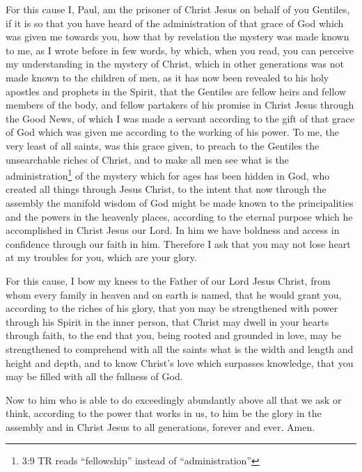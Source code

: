  For this cause I, Paul, am the prisoner of Christ Jesus on
behalf of you Gentiles,  if it is so that you have heard of
the administration of that grace of God which was given me towards you,
 how that by revelation the mystery was made known to me, as
I wrote before in few words,  by which, when you read, you
can perceive my understanding in the mystery of Christ, 
which in other generations was not made known to the children of men, as
it has now been revealed to his holy apostles and prophets in the
Spirit,  that the Gentiles are fellow heirs and fellow
members of the body, and fellow partakers of his promise in Christ Jesus
through the Good News,  of which I was made a servant
according to the gift of that grace of God which was given me according
to the working of his power.  To me, the very least of all
saints, was this grace given, to preach to the Gentiles the unsearchable
riches of Christ,  and to make all men see what is the
administration\footnote{3:9 TR reads ``fellowship'' instead of
  ``administration''} of the mystery which for ages has been hidden in
God, who created all things through Jesus Christ,  to the
intent that now through the assembly the manifold wisdom of God might be
made known to the principalities and the powers in the heavenly places,
 according to the eternal purpose which he accomplished in
Christ Jesus our Lord.  In him we have boldness and access
in confidence through our faith in him.  Therefore I ask
that you may not lose heart at my troubles for you, which are your
glory.

 For this cause, I bow my knees to the Father of our Lord
Jesus Christ,  from whom every family in heaven and on
earth is named,  that he would grant you, according to the
riches of his glory, that you may be strengthened with power through his
Spirit in the inner person,  that Christ may dwell in your
hearts through faith, to the end that you, being rooted and grounded in
love,  may be strengthened to comprehend with all the
saints what is the width and length and height and depth, 
and to know Christ's love which surpasses knowledge, that you may be
filled with all the fullness of God.

 Now to him who is able to do exceedingly abundantly above
all that we ask or think, according to the power that works in us,
 to him be the glory in the assembly and in Christ Jesus to
all generations, forever and ever. Amen.


